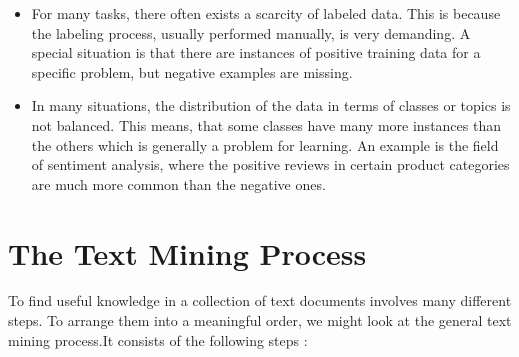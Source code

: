 \begin{itemize}
    \item For many tasks, there often exists a scarcity of labeled data. This is because the labeling process, usually performed manually, is very demanding. A special situation is that there are instances of positive training data for a specific problem, but negative examples are missing.

    \item In many situations, the distribution of the data in terms of classes or topics is not balanced. This means, that some classes have many more instances than the others which is generally a problem for learning. An example is the field of sentiment analysis, where the positive reviews in certain product categories are much more common than the negative ones.
\end{itemize}


\section{The Text Mining Process}
To find useful knowledge in a collection of text documents involves many different steps. To arrange them into a meaningful order, we might look at the general text mining process.It consists of the following steps \cite{ref271,ref133,ref196}:

